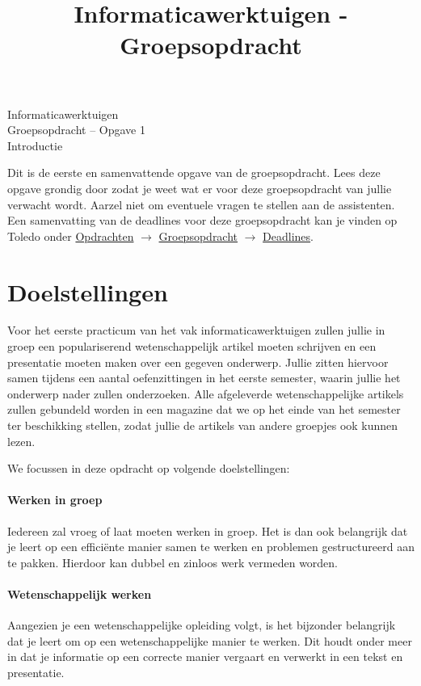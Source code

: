 \documentclass[a4paper]{article}
\title{Informaticawerktuigen - Groepsopdracht}
\begin{document}
\begin{center}
  \huge Informaticawerktuigen \\
  \Huge Groepsopdracht -- Opgave 1 \\
  \huge Introductie
\end{center}
\vspace{1em}

Dit is de eerste en samenvattende opgave van de groepsopdracht.
Lees deze opgave grondig door zodat je weet wat er voor deze groepsopdracht van jullie verwacht wordt.
Aarzel niet om eventuele vragen te stellen aan de assistenten.
Een samenvatting van de deadlines voor deze groepsopdracht kan je vinden op Toledo onder \underline{Opdrachten} $\rightarrow$ \underline{Groepsopdracht} $\rightarrow$ \underline{Deadlines}.


\section{Doelstellingen}

Voor het eerste practicum van het vak informaticawerktuigen zullen jullie in groep een populariserend wetenschappelijk artikel moeten schrijven en een presentatie moeten maken over een gegeven onderwerp.
Jullie zitten hiervoor samen tijdens een aantal oefenzittingen in het eerste semester, waarin jullie het onderwerp nader zullen onderzoeken.
Alle afgeleverde wetenschappelijke artikels zullen gebundeld worden in een magazine dat we op het einde van het semester ter beschikking stellen, zodat jullie de artikels van andere groepjes ook kunnen lezen.

We focussen in deze opdracht op volgende doelstellingen:

\paragraph{Werken in groep}
Iedereen zal vroeg of laat moeten werken in groep.
Het is dan ook belangrijk dat je leert op een effici\"ente manier samen te werken en problemen gestructureerd aan te pakken.
Hierdoor kan dubbel en zinloos werk vermeden worden.

\paragraph{Wetenschappelijk werken}
Aangezien je een wetenschappelijke opleiding volgt, is het bijzonder belangrijk dat je leert om op een wetenschappelijke manier te werken.
Dit houdt onder meer in dat je informatie op een correcte manier vergaart en verwerkt in een tekst en presentatie.
\end{document}
